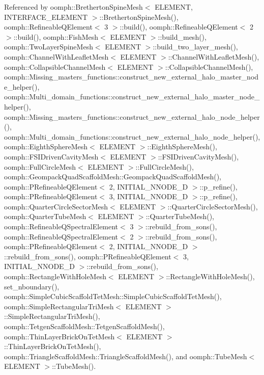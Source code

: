 Referenced by oomph\+::\+Bretherton\+Spine\+Mesh$<$ E\+L\+E\+M\+E\+N\+T, I\+N\+T\+E\+R\+F\+A\+C\+E\+\_\+\+E\+L\+E\+M\+E\+N\+T $>$\+::\+Bretherton\+Spine\+Mesh(), oomph\+::\+Refineable\+Q\+Element$<$ 3 $>$\+::build(), oomph\+::\+Refineable\+Q\+Element$<$ 2 $>$\+::build(), oomph\+::\+Fish\+Mesh$<$ E\+L\+E\+M\+E\+N\+T $>$\+::build\+\_\+mesh(), oomph\+::\+Two\+Layer\+Spine\+Mesh$<$ E\+L\+E\+M\+E\+N\+T $>$\+::build\+\_\+two\+\_\+layer\+\_\+mesh(), oomph\+::\+Channel\+With\+Leaflet\+Mesh$<$ E\+L\+E\+M\+E\+N\+T $>$\+::\+Channel\+With\+Leaflet\+Mesh(), oomph\+::\+Collapsible\+Channel\+Mesh$<$ E\+L\+E\+M\+E\+N\+T $>$\+::\+Collapsible\+Channel\+Mesh(), oomph\+::\+Missing\+\_\+masters\+\_\+functions\+::construct\+\_\+new\+\_\+external\+\_\+halo\+\_\+master\+\_\+node\+\_\+helper(), oomph\+::\+Multi\+\_\+domain\+\_\+functions\+::construct\+\_\+new\+\_\+external\+\_\+halo\+\_\+master\+\_\+node\+\_\+helper(), oomph\+::\+Missing\+\_\+masters\+\_\+functions\+::construct\+\_\+new\+\_\+external\+\_\+halo\+\_\+node\+\_\+helper(), oomph\+::\+Multi\+\_\+domain\+\_\+functions\+::construct\+\_\+new\+\_\+external\+\_\+halo\+\_\+node\+\_\+helper(), oomph\+::\+Eighth\+Sphere\+Mesh$<$ E\+L\+E\+M\+E\+N\+T $>$\+::\+Eighth\+Sphere\+Mesh(), oomph\+::\+F\+S\+I\+Driven\+Cavity\+Mesh$<$ E\+L\+E\+M\+E\+N\+T $>$\+::\+F\+S\+I\+Driven\+Cavity\+Mesh(), oomph\+::\+Full\+Circle\+Mesh$<$ E\+L\+E\+M\+E\+N\+T $>$\+::\+Full\+Circle\+Mesh(), oomph\+::\+Geompack\+Quad\+Scaffold\+Mesh\+::\+Geompack\+Quad\+Scaffold\+Mesh(), oomph\+::\+P\+Refineable\+Q\+Element$<$ 2, I\+N\+I\+T\+I\+A\+L\+\_\+\+N\+N\+O\+D\+E\+\_\+D $>$\+::p\+\_\+refine(), oomph\+::\+P\+Refineable\+Q\+Element$<$ 3, I\+N\+I\+T\+I\+A\+L\+\_\+\+N\+N\+O\+D\+E\+\_\+D $>$\+::p\+\_\+refine(), oomph\+::\+Quarter\+Circle\+Sector\+Mesh$<$ E\+L\+E\+M\+E\+N\+T $>$\+::\+Quarter\+Circle\+Sector\+Mesh(), oomph\+::\+Quarter\+Tube\+Mesh$<$ E\+L\+E\+M\+E\+N\+T $>$\+::\+Quarter\+Tube\+Mesh(), oomph\+::\+Refineable\+Q\+Spectral\+Element$<$ 3 $>$\+::rebuild\+\_\+from\+\_\+sons(), oomph\+::\+Refineable\+Q\+Spectral\+Element$<$ 2 $>$\+::rebuild\+\_\+from\+\_\+sons(), oomph\+::\+P\+Refineable\+Q\+Element$<$ 2, I\+N\+I\+T\+I\+A\+L\+\_\+\+N\+N\+O\+D\+E\+\_\+D $>$\+::rebuild\+\_\+from\+\_\+sons(), oomph\+::\+P\+Refineable\+Q\+Element$<$ 3, I\+N\+I\+T\+I\+A\+L\+\_\+\+N\+N\+O\+D\+E\+\_\+D $>$\+::rebuild\+\_\+from\+\_\+sons(), oomph\+::\+Rectangle\+With\+Hole\+Mesh$<$ E\+L\+E\+M\+E\+N\+T $>$\+::\+Rectangle\+With\+Hole\+Mesh(), set\+\_\+nboundary(), oomph\+::\+Simple\+Cubic\+Scaffold\+Tet\+Mesh\+::\+Simple\+Cubic\+Scaffold\+Tet\+Mesh(), oomph\+::\+Simple\+Rectangular\+Tri\+Mesh$<$ E\+L\+E\+M\+E\+N\+T $>$\+::\+Simple\+Rectangular\+Tri\+Mesh(), oomph\+::\+Tetgen\+Scaffold\+Mesh\+::\+Tetgen\+Scaffold\+Mesh(), oomph\+::\+Thin\+Layer\+Brick\+On\+Tet\+Mesh$<$ E\+L\+E\+M\+E\+N\+T $>$\+::\+Thin\+Layer\+Brick\+On\+Tet\+Mesh(), oomph\+::\+Triangle\+Scaffold\+Mesh\+::\+Triangle\+Scaffold\+Mesh(), and oomph\+::\+Tube\+Mesh$<$ E\+L\+E\+M\+E\+N\+T $>$\+::\+Tube\+Mesh().

